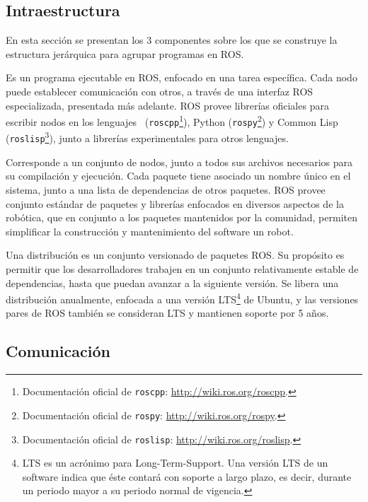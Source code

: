 \subsection{Intraestructura}

En esta sección se presentan los 3 componentes sobre los que se construye la estructura jerárquica para agrupar programas en ROS.

Es un programa ejecutable en ROS, enfocado en una tarea específica. Cada nodo puede establecer comunicación con otros, a través de una interfaz ROS especializada, presentada más adelante. ROS provee librerías oficiales para escribir nodos en los lenguajes \CC\ (\texttt{roscpp}\footnote{Documentación oficial de \texttt{roscpp}: \url{http://wiki.ros.org/roscpp}.}), Python (\texttt{rospy}\footnote{Documentación oficial de \texttt{rospy}: \url{http://wiki.ros.org/rospy}.}) y Common Lisp (\texttt{roslisp}\footnote{Documentación oficial de \texttt{roslisp}: \url{http://wiki.ros.org/roslisp}.}), junto a librerías experimentales para otros lenguajes.

Corresponde a un conjunto de nodos, junto a todos sus archivos necesarios para su compilación y ejecución. Cada paquete tiene asociado un nombre único en el sistema, junto a una lista de dependencias de otros paquetes. ROS provee conjunto estándar de paquetes y librerías enfocados en diversos aspectos de la robótica, que en conjunto a los paquetes mantenidos por la comunidad, permiten simplificar la construcción y mantenimiento del software un robot.

Una distribución es un conjunto versionado de paquetes ROS. Su propósito es permitir que los desarrolladores trabajen en un conjunto relativamente estable de dependencias, hasta que puedan avanzar a la siguiente versión. Se libera una distribución anualmente, enfocada a una versión  LTS\footnote{LTS es un acrónimo para Long-Term-Support. Una versión LTS de un software indica que éste contará con soporte a largo plazo, es decir, durante un periodo mayor a su periodo normal de vigencia.} de Ubuntu, y las versiones pares de ROS también se consideran LTS y mantienen soporte por 5 años.


\subsection{Comunicación}

